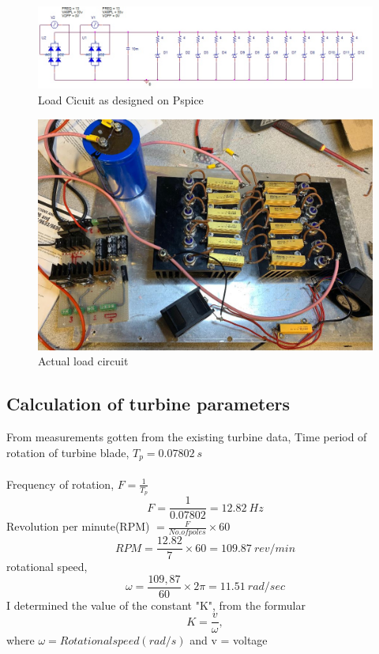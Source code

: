 \documentclass[titlepage]{article}
\begin{document}
\begin{figure}[h]
\centering
\includegraphics[scale=0.6]{Loadcct.jpg}
\caption{Load Cicuit as designed on Pspice}
\label{Loadcct}
\end{figure}

\begin{figure}[h]
\centering
\includegraphics[scale=0.3]{realcct.jpg}
\caption{Actual load circuit}
\label{constructed load cct}
\end{figure}
\clearpage
\subsection{Calculation of turbine parameters}
From measurements gotten from the existing turbine data, Time period of rotation of turbine blade, $T_{p} = 0.07802~s$ 
\paragraph{} Frequency of rotation, $F = \frac{1}{T_{p}}$ $$F = \frac{1}{0.07802} = 12.82~Hz$$
 Revolution per minute(RPM) $ = \frac{F}{No. of poles}\times60 $
\begin{equation}\label{}
RPM = \frac{12.82}{7} \times60 = 109.87~rev/min
\end{equation}
rotational speed,
\begin{equation}\label{}
\omega = \frac{109,87}{60}\times2 \pi = 11.51~rad/sec
\end{equation}
I determined the value of the constant "K", from the formular 
\begin{equation}\label{}
K = \frac{v}{\omega},
\end{equation}
where $\omega = Rotational speed (rad/s) $ and v = voltage
\end{document}
